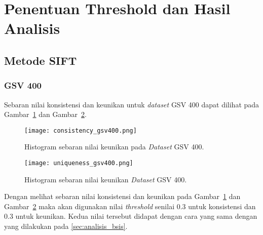 \section{Penentuan Threshold dan Hasil Analisis}
\subsection{Metode SIFT}
\subsubsection{GSV 400}
Sebaran nilai konsistensi dan keunikan untuk \textit{dataset} GSV 400 dapat dilihat pada Gambar~\ref{fig:consistency_gsv400_pengujian_sift} dan Gambar~\ref{fig:uniqueness_gsv400_pengujian_sift}.
\begin{figure}[H]
	\centering
	\texttt{[image: consistency\_gsv400.png]}
	\caption{Histogram sebaran nilai keunikan pada \textit{Dataset} GSV 400.}
	\label{fig:consistency_gsv400_pengujian_sift}
\end{figure}

\begin{figure}[H]
	\centering
	\texttt{[image: uniqueness\_gsv400.png]}
	\caption{Histogram sebaran nilai keunikan \textit{Dataset} GSV 400.}
	\label{fig:uniqueness_gsv400_pengujian_sift}
\end{figure}
Dengan melihat sebaran nilai konsistensi dan keunikan pada Gambar~\ref{fig:consistency_gsv400_pengujian_sift} dan Gambar~\ref{fig:uniqueness_gsv400_pengujian_sift} maka akan digunakan nilai \textit{threshold} senilai 0.3 untuk konsistensi dan 0.3 untuk keunikan. Kedua nilai tersebut didapat dengan cara yang sama dengan yang dilakukan pada \ref{sec:analisis_bsis}. 

